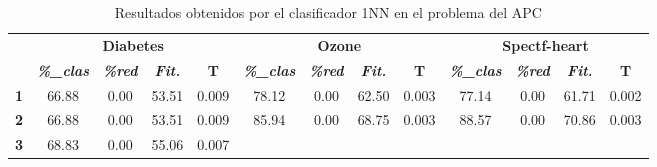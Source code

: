 \begin{table}[H]
	\caption{Resultados obtenidos por el clasificador 1NN en el problema del APC												
	}
	\label{tab:1nn}
	\begin{tabular}{ccccccccccccc}
		\cline{2-13}
		&
		\multicolumn{4}{c}{\cellcolor[HTML]{C0C0C0}\textbf{Diabetes}} &
		\multicolumn{4}{c}{\cellcolor[HTML]{C0C0C0}\textbf{Ozone}} &
		\multicolumn{4}{c}{\cellcolor[HTML]{C0C0C0}\textbf{Spectf-heart}} \\ \cline{2-13} 
		\multirow{-2}{*}{} &
		\cellcolor[HTML]{DAE8FC}\textit{\textbf{\%\_clas}} &
		\cellcolor[HTML]{DAE8FC}\textit{\textbf{\%red}} &
		\cellcolor[HTML]{DAE8FC}\textit{\textbf{Fit.}} &
		\multicolumn{1}{c|}{\cellcolor[HTML]{DAE8FC}\textbf{T}} &
		\cellcolor[HTML]{DAE8FC}\textit{\textbf{\%\_clas}} &
		\cellcolor[HTML]{DAE8FC}\textit{\textbf{\%red}} &
		\cellcolor[HTML]{DAE8FC}\textit{\textbf{Fit.}} &
		\multicolumn{1}{c|}{\cellcolor[HTML]{DAE8FC}\textbf{T}} &
		\cellcolor[HTML]{DAE8FC}\textit{\textbf{\%\_clas}} &
		\cellcolor[HTML]{DAE8FC}\textit{\textbf{\%red}} &
		\cellcolor[HTML]{DAE8FC}\textit{\textbf{Fit.}} &
		\cellcolor[HTML]{DAE8FC}\textbf{T} \\ \cline{2-13} 
		\multicolumn{1}{c|}{\cellcolor[HTML]{C0C0C0}\textbf{1}} &
		\multicolumn{1}{c|}{66.88} &
		\multicolumn{1}{c|}{0.00} &
		\multicolumn{1}{c|}{53.51} &
		\multicolumn{1}{c|}{0.009} &
		\multicolumn{1}{c|}{78.12} &
		\multicolumn{1}{c|}{0.00} &
		\multicolumn{1}{c|}{62.50} &
		\multicolumn{1}{c|}{0.003} &
		\multicolumn{1}{c|}{77.14} &
		\multicolumn{1}{c|}{0.00} &
		\multicolumn{1}{c|}{61.71} &
		\multicolumn{1}{c|}{0.002} \\ \cline{2-13} 
		\multicolumn{1}{c|}{\cellcolor[HTML]{C0C0C0}\textbf{2}} &
		\multicolumn{1}{c|}{66.88} &
		\multicolumn{1}{c|}{0.00} &
		\multicolumn{1}{c|}{53.51} &
		\multicolumn{1}{c|}{0.009} &
		\multicolumn{1}{c|}{85.94} &
		\multicolumn{1}{c|}{0.00} &
		\multicolumn{1}{c|}{68.75} &
		\multicolumn{1}{c|}{0.003} &
		\multicolumn{1}{c|}{88.57} &
		\multicolumn{1}{c|}{0.00} &
		\multicolumn{1}{c|}{70.86} &
		\multicolumn{1}{c|}{0.003} \\ \cline{2-13} 
		\multicolumn{1}{c|}{\cellcolor[HTML]{C0C0C0}\textbf{3}} &
		\multicolumn{1}{c|}{68.83} &
		\multicolumn{1}{c|}{0.00} &
		\multicolumn{1}{c|}{55.06} &
		\multicolumn{1}{c|}{0.007} &

\end{tabular}
\end{table}
